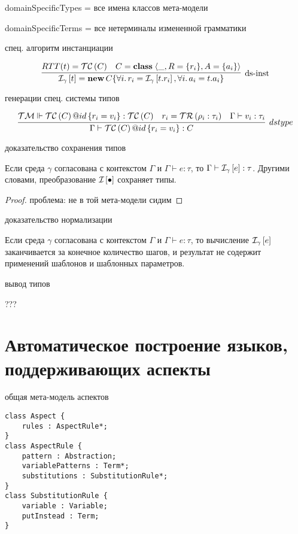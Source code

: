 domainSpecificTypes = все имена классов мета-модели

domainSpecificTerms = все нетерминалы измененной грамматики

спец. алгоритм инстанциации

$$
\trule{
	RTT(t) = \TC{C} & C = \class{}{\_}{R=\{r_i\}}{A=\{a_i\}}
}{
	\Inst{\gamma}{t} = \mathbf{new}\, C \{ \forall i.\,r_i = \Inst{\gamma}{t.r_i}, \forall i.\,a_i = t.a_i \}
}{ds-inst}
$$ 

генерации спец. системы типов

$$
\infer[dstype]{
	\Gamma \vdash \obj{\TC{C}}{id}{r_i = v_i} : C
}{
	\TM \Vdash \obj{\TC{C}}{id}{r_i = v_i} : \TC{C} &
	r_i = \TR{\rho_i : \tau_i} &
	\Gamma \vdash v_i : \tau_i
}
$$ 

доказательство сохранения типов

\begin{Th}
Если среда $\gamma$ согласована с контекстом $\Gamma$ и $\Gamma \vdash e : \tau$, то $\Gamma \vdash \mathcal{I}_{\gamma} \left[ e \right] : \tau$. Другими словами, преобразование $\mathcal{I}_{} \left[ \bullet \right]$ сохраняет типы.
\end{Th}
\begin{proof}
проблема: не в той мета-модели сидим
\end{proof}

доказательство нормализации

\begin{Th}
Если среда $\gamma$ согласована с контекстом $\Gamma$ и $\Gamma \vdash e : \tau$, то вычисление $\mathcal{I}_{\gamma} \left[ e \right]$ заканчивается за конечное количество шагов, и результат не содержит применений шаблонов и шаблонных параметров.
\end{Th}

вывод типов

???

\chapter{Автоматическое построение языков, поддерживающих аспекты}



общая мета-модель аспектов

\begin{lstlisting}
class Aspect {
	rules : AspectRule*;
}
class AspectRule {
	pattern : Abstraction;
	variablePatterns : Term*;
	substitutions : SubstitutionRule*;
}
class SubstitutionRule {
	variable : Variable;
	putInstead : Term;
}
\end{lstlisting}

